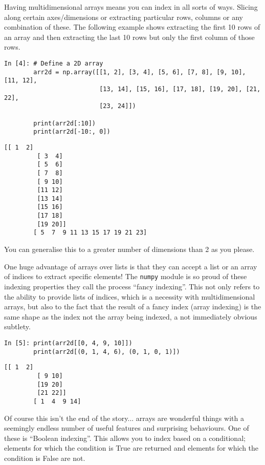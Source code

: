 Having multidimensional arrays means you can index in all sorts of ways. Slicing along certain axes/dimensions or extracting particular rows, columns or any combination of these. The following example shows extracting the first 10 rows of an array and then extracting the last 10 rows but only the first column of those rows. 

\begin{lstlisting}[style=PY]
In [4]: # Define a 2D array
        arr2d = np.array([[1, 2], [3, 4], [5, 6], [7, 8], [9, 10], [11, 12], 
                          [13, 14], [15, 16], [17, 18], [19, 20], [21, 22], 
                          [23, 24]])
        
        print(arr2d[:10])
        print(arr2d[-10:, 0])
\end{lstlisting}
\begin{lstlisting}[style=PY, backgroundcolor=\color{white}]
        [[ 1  2]
         [ 3  4]
         [ 5  6]
         [ 7  8]
         [ 9 10]
         [11 12]
         [13 14]
         [15 16]
         [17 18]
         [19 20]]
        [ 5  7  9 11 13 15 17 19 21 23]
\end{lstlisting}

You can generalise this to a greater number of dimensions than 2 as you please. 

One huge advantage of arrays over lists is that they can accept a list or an array of indices to extract specific elements! The \texttt{numpy} module is so proud of these indexing properties they call the process ``fancy indexing''. This not only refers to the ability to provide lists of indices, which is a necessity with multidimensional arrays, but also to the fact that the result of a fancy index (array indexing) is the same shape as the index not the array being indexed, a not immediately obvious subtlety. 

\begin{lstlisting}[style=PY]
In [5]: print(arr2d[[0, 4, 9, 10]])
        print(arr2d[(0, 1, 4, 6), (0, 1, 0, 1)])
\end{lstlisting}
\begin{lstlisting}[style=PY, backgroundcolor=\color{white}]
        [[ 1  2]
         [ 9 10]
         [19 20]
         [21 22]]
        [ 1  4  9 14]
\end{lstlisting}

Of course this isn't the end of the story... arrays are wonderful things with a seemingly endless number of useful features and surprising behaviours. One of these is ``Boolean indexing''. This allows you to index based on a conditional; elements for which the condition is True are returned and elements for which the condition is False are not.

